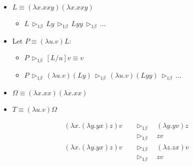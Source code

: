 \documentclass{beamer}
\newcommand{\contract}{\ensuremath{\triangleright_{1\beta}}}
\begin{document}

\begin{frame}

  \begin{examples}
    \begin{itemize}
    \item
      $L \equiv (\lambda{x}.xxy)(\lambda{x}.xxy)$
      \begin{itemize}
      \item
        $L \,\contract\, Ly \,\contract\, Lyy \,\contract \,\dots$
      \end{itemize}
    \item
      Let $P \equiv (\lambda{u}.v)L$:
      \begin{itemize}
      \item
        $P \,\contract\, [L/u]v \equiv v$
      \item
        $P \,\contract\, (\lambda{u}.v)(Ly) \,\contract\,
        (\lambda{u}.v)(Lyy) \,\contract\, \dots$
      \end{itemize}
    \end{itemize}
  \end{examples}
\end{frame}


\begin{frame}

  \begin{examples}
    \begin{itemize}
    \item
      $\Omega \equiv (\lambda{x}.xx)(\lambda{x}.xx)$
    \item
      $T \equiv (\lambda{u}.v)\Omega$
    \end{itemize}
  \end{examples}
\end{frame}


\begin{frame}

  \begin{example}
    \begin{align*}
      (\lambda{x}.(\lambda{y}.yx)z)v
      &\quad\contract\quad (\lambda{y}.yv)z\\
      &\quad\contract\quad zv\\
      (\lambda{x}.(\lambda{y}.yx)z)v
      &\quad\contract\quad (\lambda{z}.zx)v\\
      &\quad\contract\quad zv
    \end{align*}
  \end{example}
\end{frame}
\end{document}

